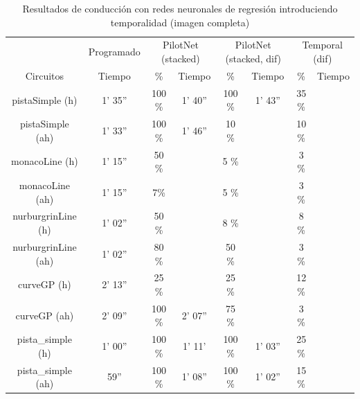 \begin{table}[H]
\centering
\caption{Resultados de conducción con redes neuronales de regresión introduciendo temporalidad (imagen completa)}
\label{resultados_regresion_temporal_completa}
\begin{tabular}{c|c|c|c|c|c|c|c|}
\cline{2-8}
                          & \multicolumn{1}{c|}{Programado} & \multicolumn{2}{c|}{PilotNet (stacked)} & \multicolumn{2}{c|}{PilotNet (stacked, dif)} & \multicolumn{2}{c|}{Temporal (dif)} \\ \cline{1-8} 
                        \multicolumn{1}{|c|}{Circuitos}    & Tiempo       & \%       & Tiempo       & \%        & Tiempo  & \%        & Tiempo          \\ \hline
\multicolumn{1}{|c|}{pistaSimple (h)}    & 1' 35''      & 100 \%     & 1' 40''  & 100 \%     & 1' 43''   & 35 \%       &     \\ \hline
\multicolumn{1}{|c|}{pistaSimple (ah)}     & 1' 33''           & 100 \%   & 1' 46''    & 10 \%        &   & 10 \%       &  \\ \hline
\multicolumn{1}{|c|}{monacoLine (h)}      & 1' 15''           & 50 \%         &         & 5 \%           &     & 3 \%        &                 \\ \hline
\multicolumn{1}{|c|}{monacoLine (ah)}       & 1' 15''    & 7\%      &         & 5 \%          &    & 3 \%       &        \\ \hline
\multicolumn{1}{|c|}{nurburgrinLine (h)}      & 1' 02''       & 50 \%       &          & 8 \%        &     & 8 \%        &     \\ \hline
\multicolumn{1}{|c|}{nurburgrinLine (ah)}       & 1' 02''     & 80 \%    &      & 50 \%     &   & 3 \%        &            \\ \hline
\multicolumn{1}{|c|}{curveGP (h)}     & 2' 13''      & 25 \%       &      & 25 \%     &     &  12 \%       &           \\ \hline
\multicolumn{1}{|c|}{curveGP (ah)}       & 2' 09''            & 100 \%     & 2' 07''     &  75 \%     &   & 3 \%      &        \\ \hline
\multicolumn{1}{|c|}{pista\_simple (h)}       & 1' 00''           & 100 \%     & 1' 11'      & 100 \%       & 1' 03''    & 25 \%      &         \\ \hline
\multicolumn{1}{|c|}{pista\_simple (ah)}     & 59''      & 100 \%     & 1' 08''     & 100 \%       & 1' 02''    & 15 \%      &                \\ \hline
\end{tabular}
\end{table}

